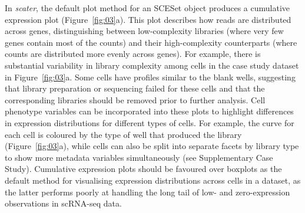 \documentclass[10pt,letterpaper]{article}
\begin{document}
In \emph{scater}, the default plot method for an SCESet object produces
a cumulative expression plot (Figure~\ref{fig:03}a). This plot describes how reads are distributed across genes, distinguishing between low-complexity libraries (where very few genes contain most of the counts) and their high-complexity counterparts (where counts are distributed more evenly across genes).
For example, there is substantial variability in library complexity among cells in the case study dataset in Figure~\ref{fig:03}a. Some cells have profiles similar to the blank wells,
suggesting that library preparation or sequencing failed for these cells and
that the corresponding libraries should be removed prior to further analysis.
Cell phenotype variables can be incorporated into these plots to highlight
differences in expression distributions for different types of cells. For
example, the curve for each cell is coloured by the type of well that produced
the library (Figure~\ref{fig:03}a), while cells can also be split into separate
facets by library type to show more metadata variables simultaneously (see
Supplementary Case Study). Cumulative expression plots should be favoured over
boxplots as the default method for visualising expression distributions across
cells in a dataset, as the latter performs poorly at handling the long tail of
low- and zero-expression observations in scRNA-seq data.
\end{document}
